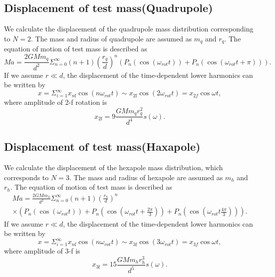 \documentclass[]{spie}  %
\begin{document}
\subsection{Displacement of test mass(Quadrupole)} \label{Quad}
We calculate the displacement of the quadrupole mass distribution corresponding to $N=2$.
The mass and radius of quadrupole are assumed as $m_q$ and $r_q$. 
The equation of motion of test mass is described as
\begin{equation}
Ma=\frac{2GMm_q}{d^2}\Sigma^{\infty}_{n=0}(n+1) \left( \frac{r_q}{d} \right)^n \left( P_n\left(\cos{\left(\omega_{rot} t \right)}\right) + P_n\left(\cos{\left(\omega_{rot} t +\pi \right)}\right) \right).
\end{equation} 
If we assume $r \ll d$, the displacement of the time-dependent lower harmonics can be written by 
\begin{equation}
x=\Sigma_{i=1}^{\infty}x_{n\mathrm{f}}\cos(n\omega_{rot} t)\sim x_{2\mathrm{f}}\cos(2\omega_{rot} t)=x_{2f}\cos{\omega t},
\end{equation}
where amplitude of 2-f rotation is
\begin{equation}
x_{2\mathrm{f}}=9\frac{GMm_{q}r_{q}^2}{d^4}s(\omega). \label{2f}
\end{equation}

\subsection{Displacement of test mass(Haxapole)} \label{Hexa}
We calculate the displacement of the hexapole mass distribution, which corresponds to $N=3$.
The mass and radius of hexapole are assumed as $m_h$ and $r_h$. 
The equation of motion of test mass is described as
\begin{eqnarray}
Ma = \frac{2GMm_h}{d^2}\Sigma^{\infty}_{n=0}(n+1) \left( \frac{r_h}{d} \right)^n \\
\times \left( P_n\left(\cos{\left(\omega_{rot} t \right)}\right) + P_n\left(\cos{\left(\omega_{rot} t+\frac{2\pi}{3} \right)} \right) + P_n\left(\cos{\left(\omega_{rot} t \frac{4\pi}{3} \right) }\right) \right).
\end{eqnarray} 
If we assume $r \ll d$, the displacement of the time-dependent lower harmonics can be written by 
\begin{equation}
x=\Sigma_{i=1}^{\infty}x_{n\mathrm{f}}\cos(n\omega_{rot} t)\sim  x_{3\mathrm{f}}\cos(3\omega_{rot} t)=x_{3f}\cos{\omega t},
\end{equation}
where amplitude of 3-f is
\begin{equation}
 x_{3\mathrm{f}}=15\frac{GMm_{h}r_{h}^3}{d^5}s(\omega). \label{3f}
\end{equation}
\end{document}
